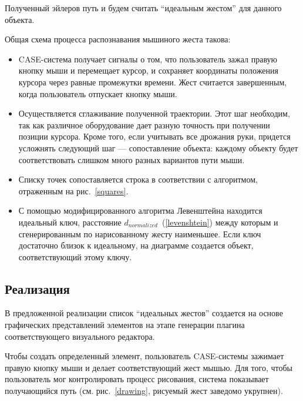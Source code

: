 \documentclass[a5paper]{article}
\begin{document}
Полученный эйлеров путь и будем считать ``идеальным жестом'' для данного объекта. 

Общая схема процесса распознавания мышиного жеста такова:

\begin{itemize}
  \item CASE-система получает сигналы о том, что пользователь зажал правую кнопку мыши и перемещает курсор, и сохраняет координаты положения курсора через равные промежутки времени. Жест считается завершенным, когда пользователь отпускает кнопку мыши.
  \item Осуществляется сглаживание полученной траектории. Этот шаг необходим, так как различное оборудование дает разную точность при получении 
позиции курсора. Кроме того, если учитывать все дрожания руки, придется усложнять следующий шаг --- сопоставление объекта: каждому объекту
будет соответствовать слишком много разных вариантов пути мыши.
  \item Списку точек сопоставляется строка в соответствии с алгоритмом, отраженным на рис.~\ref{squares}.
  \item С помощью модифицированного алгоритма Левенштейна находится идеальный ключ, расстояние $d_{normalized}$~(\ref{levenshtein}) между которым и 
сгенерированным по нарисованному жесту наименьшее. Если ключ достаточно близок к идеальному, на диаграмме создается объект, соответствующий этому ключу.
\end{itemize}

\subsection{Реализация}
В предложенной реализации список ``идеальных жестов'' создается на основе графических представлений элементов на этапе генерации плагина соответствующего
визуального редактора.

Чтобы создать определенный элемент, пользователь CASE-системы зажимает правую кнопку мыши и делает соответствующий жест мышью. 
Для того, чтобы пользователь мог контролировать процесс рисования, система показывает получающийся путь (см. рис.~\ref{drawing}, 
рисуемый жест заведомо укрупнен).
\end{document}
